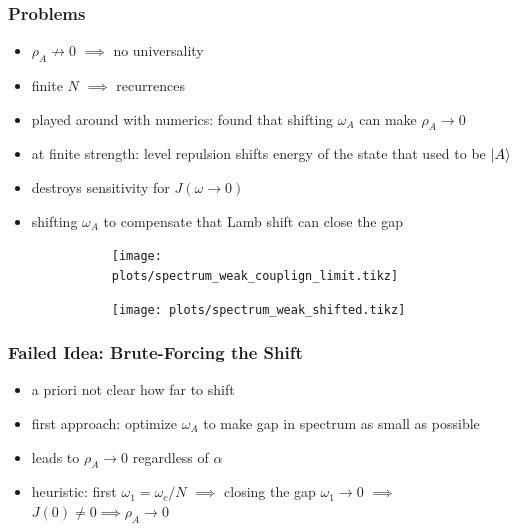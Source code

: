 \documentclass[10pt, aspectratio=169]{beamer}
\begin{document}
\begin{frame}
  \frametitle{Problems}
  \begin{itemize}
  \item \(ρ_{A}\not\to 0\) \(\implies\) no universality
  \item finite \(N\) \(\implies\) recurrences

  \item played around with numerics: found that shifting \(ω_{A}\) can
    make \(ρ_{A}\to 0\)
  \item at finite strength: level repulsion shifts energy of the state
    that used to be \(\ket{A}\)
  \item destroys sensitivity for \(J(ω\to 0)\)
  \item shifting \(ω_{A}\) to compensate that Lamb shift can close the gap
    \begin{figure}[htp]
      \centering
      \begin{subfigure}[b]{0.45\columnwidth}
        \centering
        \texttt{[image: plots/spectrum\_weak\_couplign\_limit.tikz]}
      \end{subfigure}
      \begin{subfigure}[b]{0.45\columnwidth}
        \centering
        \texttt{[image: plots/spectrum\_weak\_shifted.tikz]}
      \end{subfigure}
    \end{figure}
  \end{itemize}
\end{frame}

\begin{frame}
  \frametitle{Failed Idea: Brute-Forcing the Shift}
  \begin{itemize}
  \item a priori not clear how far to shift
  \item first approach: optimize \(ω_{A}\) to make gap in spectrum as
    small as possible
  \item leads to \(ρ_{A}\to 0\) regardless of \(α\)
  \item heuristic: first \(ω_{1}=ω_{c}/N\) \(\implies\) closing the
    gap \(ω_{1}\to 0\) \(\implies\) \(J(0)\neq 0 \implies ρ_{A}\to 0\)
  \end{itemize}
\end{frame}
\end{document}
